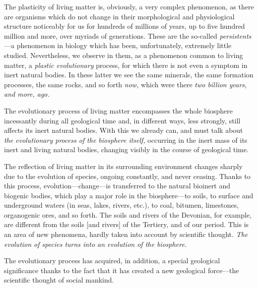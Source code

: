The plasticity of living matter is, obviously, a very complex phenomenon, as
there are organisms which do not change in their morphological and
physiological structure noticeably for us for hundreds of millions of years, up
to five hundred million and more, over myriads of generations.  These are the
so-called \emph{persistents}\fncomma{}---a phenomenon in biology which has been, unfortunately, extremely little
studied.  Nevertheless, we observe in them, as a phenomenon common to living
matter, a \emph{plastic evolutionary} process, for which there is not even a
symptom in inert natural bodies.  In these latter we see the same minerals, the
same formation processes, the same rocks, and so forth \emph{now,} which were
there \emph{two billion years, and more, ago.}

The evolutionary process of living matter encompasses the whole biosphere
incessantly during all geological time and, in different ways, less strongly,
still affects its inert natural bodies.  With this we already can, and must
talk about \emph{the evolutionary process of the biosphere itself,} occurring
in the inert mass of its inert and living natural
bodies, changing visibly in the course of geological time.

The reflection of living matter in its surrounding environment changes sharply
due to the evolution of species, ongoing constantly, and never ceasing.  Thanks
to this process, evolution---change---is transferred to the natural bioinert
and biogenic bodies, which play a major role in the biosphere---to soils, to
surface and underground waters (in seas, lakes, rivers, etc.), to coal,
bitumen, limestones, organogenic ores, and so forth.  The soils and rivers of
the Devonian, for example, are different from the soils [and
rivers] of the
Tertiery, and of our period.  This is an area of new phenomena, hardly taken
into account by scientific thought.  \emph{The evolution of species turns into
an evolution of the biosphere.}


\Section \label{sec:9}%
The evolutionary process has acquired, in addition, a special geological
significance thanks to the fact that it has created a new geological
force---the scientific thought of social mankind.

